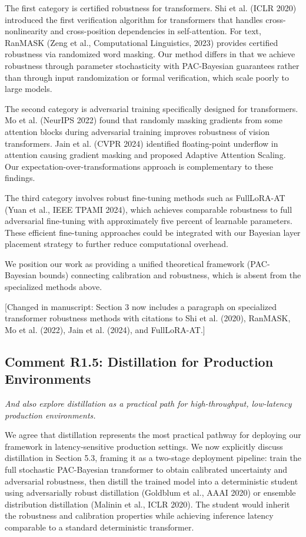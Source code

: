 \documentclass[12pt,a4paper]{article}
\newcommand{\reviewertext}[1]{\textcolor{reviewercolor}{\textit{#1}}}
\newcommand{\response}[1]{\textcolor{responsecolor}{#1}}
\newcommand{\changed}[1]{\textcolor{changecolor}{[Changed in manuscript: #1]}}
\begin{document}
\response{The first category is certified robustness for transformers. Shi et al. (ICLR 2020) introduced the first verification algorithm for transformers that handles cross-nonlinearity and cross-position dependencies in self-attention. For text, RanMASK (Zeng et al., Computational Linguistics, 2023) provides certified robustness via randomized word masking. Our method differs in that we achieve robustness through parameter stochasticity with PAC-Bayesian guarantees rather than through input randomization or formal verification, which scale poorly to large models.}

\response{The second category is adversarial training specifically designed for transformers. Mo et al. (NeurIPS 2022) found that randomly masking gradients from some attention blocks during adversarial training improves robustness of vision transformers. Jain et al. (CVPR 2024) identified floating-point underflow in attention causing gradient masking and proposed Adaptive Attention Scaling. Our expectation-over-transformations approach is complementary to these findings.}

\response{The third category involves robust fine-tuning methods such as FullLoRA-AT (Yuan et al., IEEE TPAMI 2024), which achieves comparable robustness to full adversarial fine-tuning with approximately five percent of learnable parameters. These efficient fine-tuning approaches could be integrated with our Bayesian layer placement strategy to further reduce computational overhead.}

\response{We position our work as providing a unified theoretical framework (PAC-Bayesian bounds) connecting calibration and robustness, which is absent from the specialized methods above.}

\changed{Section 3 now includes a paragraph on specialized transformer robustness methods with citations to Shi et al. (2020), RanMASK, Mo et al. (2022), Jain et al. (2024), and FullLoRA-AT.}

\bigskip

\subsection*{Comment R1.5: Distillation for Production Environments}

\reviewertext{And also explore distillation as a practical path for high-throughput, low-latency production environments.}

\bigskip

\response{We agree that distillation represents the most practical pathway for deploying our framework in latency-sensitive production settings. We now explicitly discuss distillation in Section 5.3, framing it as a two-stage deployment pipeline: train the full stochastic PAC-Bayesian transformer to obtain calibrated uncertainty and adversarial robustness, then distill the trained model into a deterministic student using adversarially robust distillation (Goldblum et al., AAAI 2020) or ensemble distribution distillation (Malinin et al., ICLR 2020). The student would inherit the robustness and calibration properties while achieving inference latency comparable to a standard deterministic transformer.}
\end{document}
